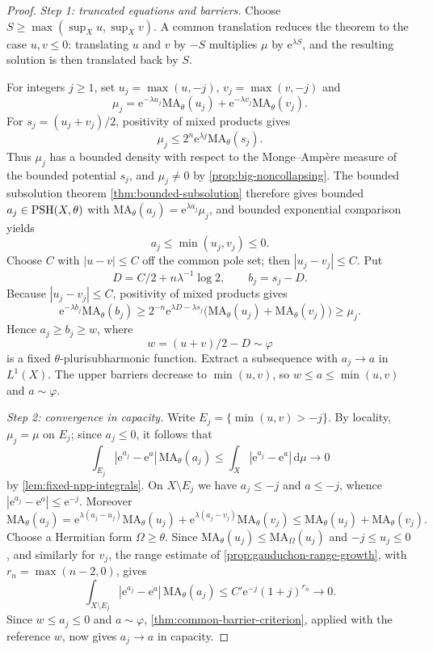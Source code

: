 \begin{proof}
\emph{Step 1: truncated equations and barriers.} Choose $S\geq\max(\sup_Xu,\sup_Xv)$. A common translation reduces the theorem to the case $u,v\leq0$: translating $u$ and $v$ by $-S$ multiplies $\mu$ by $\mathrm{e}^{\lambda S}$, and the resulting solution is then translated back by $S$.

For integers $j\geq1$, set $u_j=\max(u,-j)$, $v_j=\max(v,-j)$ and
\[
 \mu_j=\mathrm{e}^{-\lambda u_j}\mathrm{MA}_\theta(u_j)
           +\mathrm{e}^{-\lambda v_j}\mathrm{MA}_\theta(v_j).
\]
For $s_j=(u_j+v_j)/2$, positivity of mixed products gives
\[
 \mu_j\leq2^n \mathrm{e}^{\lambda j}\mathrm{MA}_\theta(s_j).
\]
Thus $\mu_j$ has a bounded density with respect to the Monge--Amp\`ere measure of the bounded potential $s_j$, and $\mu_j\neq0$ by \cref{prop:big-noncollapsing}. The bounded subsolution theorem \cref{thm:bounded-subsolution} therefore gives bounded $a_j\in\mathrm{PSH}(X,\theta)$ with $\mathrm{MA}_\theta(a_j)=\mathrm{e}^{\lambda a_j}\mu_j$, and bounded exponential comparison yields
\[
 a_j\leq\min(u_j,v_j)\leq0.
\]
Choose $C$ with $|u-v|\leq C$ off the common pole set; then $|u_j-v_j|\leq C$. Put
\[
 D=C/2+n\lambda^{-1}\log2,\qquad b_j=s_j-D.
\]
Because $|u_j-v_j|\leq C$, positivity of mixed products gives
\[
 \mathrm{e}^{-\lambda b_j}\mathrm{MA}_\theta(b_j)
 \geq2^{-n}\mathrm{e}^{\lambda D-\lambda s_j}
            \bigl(\mathrm{MA}_\theta(u_j)+\mathrm{MA}_\theta(v_j)\bigr)
 \geq\mu_j.
\]
Hence $a_j\geq b_j\geq w$, where
\[
 w=(u+v)/2-D\sim\varphi
\]
is a fixed $\theta$-plurisubharmonic function. Extract a subsequence with $a_j\to a$ in $L^1(X)$. The upper barriers decrease to $\min(u,v)$, so $w\leq a\leq\min(u,v)$ and $a\sim\varphi$.

\emph{Step 2: convergence in capacity.} Write $E_j=\{\min(u,v)>-j\}$. By locality, $\mu_j=\mu$ on $E_j$; since $a_j\leq0$, it follows that
\[
 \int_{E_j}|\mathrm{e}^{a_j}-\mathrm{e}^a|\,\mathrm{MA}_\theta(a_j)
 \leq\int_X|\mathrm{e}^{a_j}-\mathrm{e}^a|\,\mathrm{d}\mu\longrightarrow0
\]
by \cref{lem:fixed-npp-integrals}. On $X\setminus E_j$ we have $a_j\leq-j$ and $a\leq-j$, whence $|\mathrm{e}^{a_j}-\mathrm{e}^a|\leq \mathrm{e}^{-j}$. Moreover
\[
 \mathrm{MA}_\theta(a_j)
 =\mathrm{e}^{\lambda(a_j-u_j)}\mathrm{MA}_\theta(u_j)
    +\mathrm{e}^{\lambda(a_j-v_j)}\mathrm{MA}_\theta(v_j)
 \leq\mathrm{MA}_\theta(u_j)+\mathrm{MA}_\theta(v_j).
\]
Choose a Hermitian form $\Omega\geq\theta$. Since $\mathrm{MA}_\theta(u_j)\leq\mathrm{MA}_\Omega(u_j)$ and $-j\leq u_j\leq0$, and similarly for $v_j$, the range estimate of \cref{prop:gauduchon-range-growth}, with $r_n=\max(n-2,0)$, gives
\[
 \int_{X\setminus E_j}|\mathrm{e}^{a_j}-\mathrm{e}^a|\,\mathrm{MA}_\theta(a_j)
 \leq C'\mathrm{e}^{-j}(1+j)^{r_n}\longrightarrow0.
\]
Since $w\leq a_j\leq0$ and $a\sim\varphi$, \cref{thm:common-barrier-criterion}, applied with the reference $w$, now gives $a_j\to a$ in capacity.


\end{proof}
